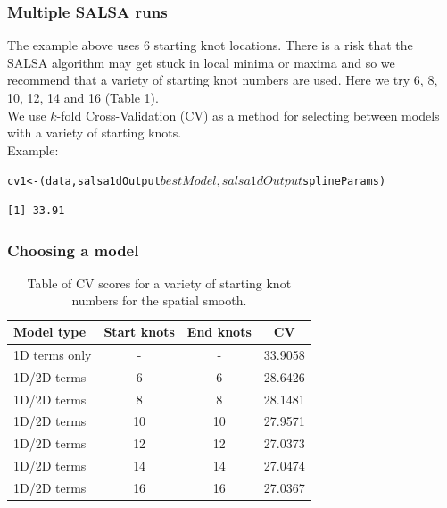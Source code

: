 \begin{frame}[fragile]
\frametitle{Multiple SALSA runs}

\noindent The example above uses 6 starting knot locations.  There is a risk that the SALSA algorithm may get stuck in local minima or maxima and so we recommend that a variety of starting knot numbers are used.  Here we try 6, 8, 10, 12, 14 and 16 (Table \ref{tab:nsfitstats}).  \\

\noindent We use $k$-fold Cross-Validation (CV) as a method for selecting between models with a variety of starting knots.\\

Example:
\begin{knitrout}\footnotesize
{}\color{fgcolor}
\end{knitrout}


\begin{knitrout}\footnotesize
{}\color{fgcolor}\begin{kframe}
\begin{alltt}
cv1 <- (data, salsa1dOutput$bestModel, salsa1dOutput$splineParams)
\end{alltt}
\begin{verbatim}
[1] 33.91
\end{verbatim}
\end{kframe}
\end{knitrout}

\end{frame}

\begin{frame}[fragile]
\frametitle{Choosing a model}
\begin{table}[h]
\caption{Table of CV scores for a variety of starting knot numbers for the spatial smooth.}
\centering
\begin{tabular}{l|c|c|c}
\textbf{Model type} & \textbf{Start knots} & \textbf{End knots}  & \textbf{CV}\\
\hline
1D terms only & - & - & 33.9058\\
1D/2D terms & 6 & 6  & 28.6426\\
1D/2D terms & 8 & 8  & 28.1481\\
1D/2D terms & 10 & 10  & 27.9571\\
1D/2D terms & 12 & 12  & 27.0373\\
1D/2D terms & 14 & 14  & 27.0474\\
1D/2D terms & 16 & 16  & 27.0367\\
\end{tabular}
\label{tab:nsfitstats}
\end{table}
\end{frame}


